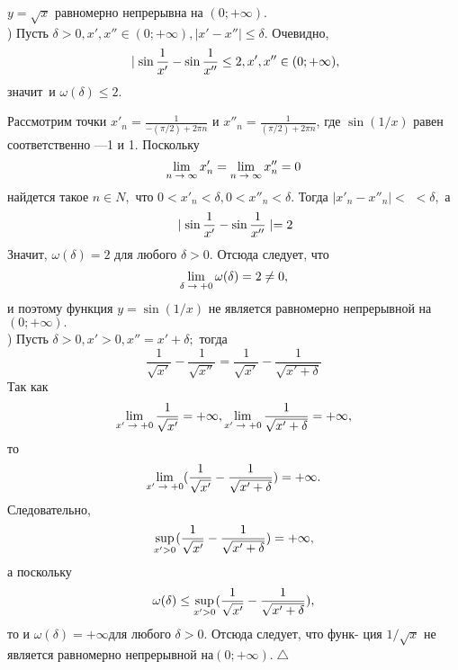 \documentclass[12pt]{article}
\begin{document}
\setlength{\headsep}{0.8cm}

\pagestyle{fancy}
\fancyhf{} 
\fancyhead[C]{\fontsize{14pt}{skip}\selectfont\itshape\rightmark}

\fontsize{18pt}{18pt}
\selectfont
\setlength{\parindent}{0.8cm}
{
  $y = \sqrt{x}$ равномерно непрерывна на $(0; +\infty)$.\\
 ) Пусть $\delta > 0, x', x'' \in (0; +\infty), \mid x' - x''\mid \leq \delta$. Очевидно,\\
 $$\small\ \mid \sin\frac{1}{x'} - \sin\frac{1}{x''} \leq 2, x', x'' \in (0; +\infty), $$
 значит\, и $\omega(\delta) \leq 2.$ \\
 \par Рассмотрим точки $x'_n=\frac{1}{-(\pi/2) + 2\pi n}$ и $x''_n=\frac{1}{(\pi/2) + 2\pi n}$, где\linebreak
 $\sin(1/x)$ равен соответственно —1 и 1. Поскольку\\
 $$\small\lim\limits_{n\;\to\;\infty} x'_n = \small\lim\limits_{n\;\to\;\infty} x''_n = 0$$
 найдется такое $n \in N,$ что $0 < x'_n < \delta, 0 < x''_n < \delta.$ Тогда $\mid x'_n - x''_n \mid <$\linebreak
 $< \delta,$ а
 $$\small\ \mid \sin\frac{1}{x'} - \sin\frac{1}{x''}\mid = 2$$
Значит, $\omega(\delta) = 2$ для любого $\delta > 0.$ Отсюда следует, что\\
$$\small\lim\limits_{\delta\;\to\;+0} \omega(\delta) = 2 \neq 0,$$
и поэтому функция $y = \sin(1/x)$ не является равномерно непрерывной\linebreak
на $(0; +\infty).$\\
) Пусть $\delta > 0, x' > 0, x'' = x' + \delta;$ тогда\\
$$\frac{1}{\sqrt{x'}}-\frac{1}{\sqrt{x''}} = \frac{1}{\sqrt{x'}} - \frac{1}{\sqrt{x' + \delta}}$$
Так как
$$\small\lim\limits_{x'\;\to\;+0} \frac{1}{\sqrt{x'}} = +\infty, \small\lim\limits_{x'\;\to\;+0} \frac{1}{\sqrt{x' + \delta}} = +\infty,$$
то $$\small\lim\limits_{x'\;\to\;+0} (\frac{1}{\sqrt{x'}} - \frac{1}{\sqrt{x' +\delta}}) = +\infty.$$
Следовательно, $$\small\sup\limits_{x'>0} (\frac{1}{\sqrt{x'}} - \frac{1}{\sqrt{x' +\delta}}) = +\infty,$$
а поскольку $$\omega(\delta) \leq \small\sup\limits_{x'>0} (\frac{1}{\sqrt{x'}} - \frac{1}{\sqrt{x' +\delta}}), $$
 то и $\omega(\delta) = +\infty$для любого $\delta > 0$. Отсюда следует, что функ-\linebreak
 ция $1/\sqrt{x}$ не является равномерно непрерывной на$ (0; +\infty).\bigtriangleup$ \\
}
\end{document}
